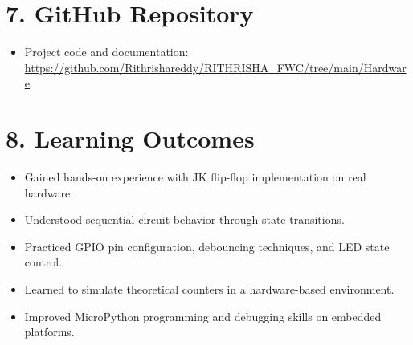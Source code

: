 \documentclass[12pt]{article}
\begin{document}
\section*{7. GitHub Repository}
\begin{itemize}
    \item Project code and documentation: \\
    \url{https://github.com/Rithrishareddy/RITHRISHA_FWC/tree/main/Hardware}
\end{itemize}

\section*{8. Learning Outcomes}
\begin{itemize}
    \item Gained hands-on experience with JK flip-flop implementation on real hardware.
    \item Understood sequential circuit behavior through state transitions.
    \item Practiced GPIO pin configuration, debouncing techniques, and LED state control.
    \item Learned to simulate theoretical counters in a hardware-based environment.
    \item Improved MicroPython programming and debugging skills on embedded platforms.
\end{itemize}
\end{document}
